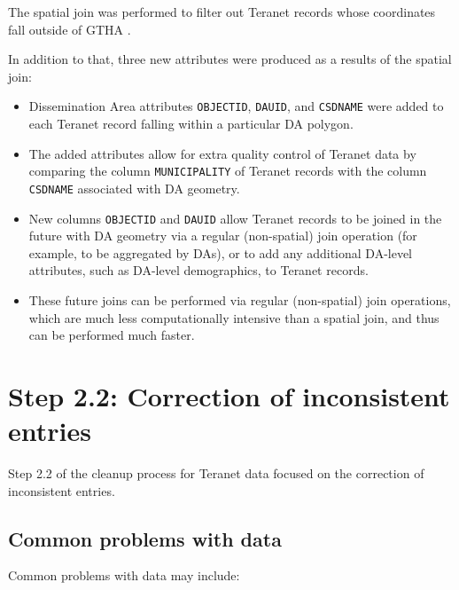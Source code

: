 \documentclass[11pt]{article}
\begin{document}
    The spatial join was performed to filter out Teranet records whose coordinates fall outside of GTHA .

    In addition to that, three new attributes were produced as a results of the spatial join:
    \begin{itemize}
        \item Dissemination Area attributes \texttt{OBJECTID}, \texttt{DAUID}, and \texttt{CSDNAME} were added to each Teranet record falling within a particular DA polygon.
        \item The added attributes allow for extra quality control of Teranet data by comparing the column \texttt{MUNICIPALITY} of Teranet records with the column \texttt{CSDNAME} associated with DA geometry.
        \item New columns \texttt{OBJECTID} and \texttt{DAUID} allow Teranet records to be joined in the future with DA geometry via a regular (non-spatial) join operation (for example, to be aggregated by DAs), or to add any additional DA-level attributes, such as DA-level demographics, to Teranet records.
        \item These future joins can be performed via regular (non-spatial) join operations, which are much less computationally intensive than a spatial join, and thus can be performed much faster.
    \end{itemize}

    \section{Step 2.2: Correction of inconsistent entries} \label{sec:teranet_correction_inconsistent}

    Step 2.2 of the cleanup process for Teranet data focused on the correction of inconsistent entries.

    \subsection{Common problems with data} \label{subsec:common_data_problems}
    Common problems with data may include:
\end{document}
